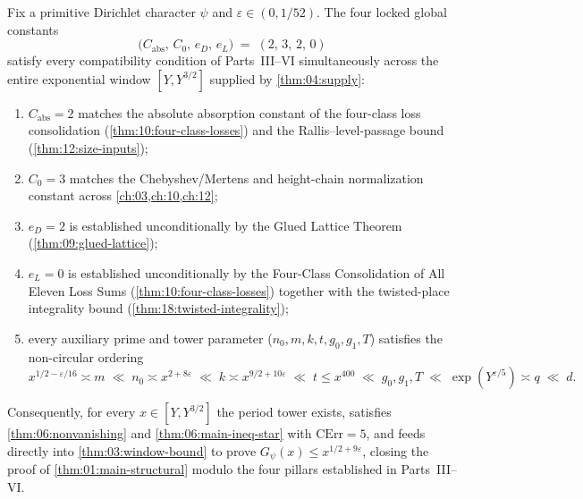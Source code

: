 \begin{theorem}
\label{thm:06:global-assembly}
Fix a primitive Dirichlet character $\psi$ and $\varepsilon \in (0, 1/52)$. The four locked global constants
\begin{equation}
\label{eq:06:locked-four}
  \bigl(C_{\mathrm{abs}},\, C_0,\, e_D,\, e_L\bigr) \;=\; (2,\, 3,\, 2,\, 0)
\end{equation}
satisfy every compatibility condition of Parts~III--VI simultaneously across the entire exponential window $[Y, Y^{3/2}]$ supplied by \cref{thm:04:supply}:
\begin{enumerate}[label=\textup{(\roman*)}]
\item $C_{\mathrm{abs}} = 2$ matches the absolute absorption constant of the four-class loss consolidation (\cref{thm:10:four-class-losses}) and the Rallis--level-passage bound (\cref{thm:12:size-inputs});
\item $C_0 = 3$ matches the Chebyshev/Mertens and height-chain normalization constant across \cref{ch:03,ch:10,ch:12};
\item $e_D = 2$ is established unconditionally by the Glued Lattice Theorem (\cref{thm:09:glued-lattice});
\item $e_L = 0$ is established unconditionally by the Four-Class Consolidation of All Eleven Loss Sums (\cref{thm:10:four-class-losses}) together with the twisted-place integrality bound (\cref{thm:18:twisted-integrality});
\item every auxiliary prime and tower parameter ($n_0, m, k, t, g_0, g_1, T$) satisfies the non-circular ordering
  \[
    x^{1/2-\varepsilon/16} \asymp m \;\ll\; n_0 \asymp x^{2+8\varepsilon} \;\ll\; k \asymp x^{9/2+10\varepsilon} \;\ll\; t \le x^{400} \;\ll\; g_0, g_1, T \;\ll\; \exp(Y^{\varepsilon/5}) \asymp q \;\ll\; d.
  \]
\end{enumerate}
Consequently, for every $x \in [Y, Y^{3/2}]$ the period tower exists, satisfies \cref{thm:06:nonvanishing} and \cref{thm:06:main-ineq-star} with $\mathrm{CErr} = 5$, and feeds directly into \cref{thm:03:window-bound} to prove $G_\psi(x) \le x^{1/2 + 9\varepsilon}$, closing the proof of \cref{thm:01:main-structural} modulo the four pillars established in Parts~III--VI.
\end{theorem}

